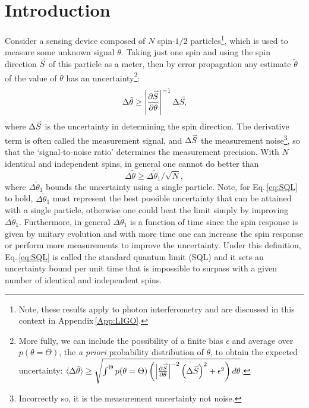 \documentclass[reqno]{amsart}
\def\be{\begin{equation}}
\def\ee{\end{equation}}
\def\est#1{\tilde{#1}}
\newcommand{\myvec}[1]{\accentset{\rightharpoonup}{#1}}
\begin{document}
\section*{Introduction}
Consider a sensing device composed of $N$ spin-$1/2$ particles\footnote{Note, these results apply to photon interferometry and are discussed in this context in Appendix\,\ref{App:LIGO}.}, which is used to measure some unknown signal $\theta$. %
Taking just one spin and using the spin direction $\myvec{S}$ of this particle as a meter, then by error propagation any estimate $\est{\theta}$ of the value of $\theta$ has an uncertainty\footnote{More fully, we can include the possibility of a finite bias $\epsilon$ and average over $p(\theta = \Theta)$, the \emph{a priori} probability distribution of $\theta$, to obtain the expected uncertainty: $\langle \Delta \est{\theta}\rangle \geq \sqrt{\int^{\Theta} p(\theta = \Theta)\left( \left| \frac{\partial \myvec{S}}{\partial \theta} \right|^{-2} \left(\Delta \myvec{S}\right)^2+\epsilon^2\right) d\theta}$.}:
\be
\Delta \est{\theta} \geq \left| \frac{\partial \myvec{S}}{\partial \theta} \right|^{-1} \Delta \myvec{S}, %
\label{eq:SNR}
\ee
where $\Delta \myvec{S}$ is the uncertainty in determining the spin direction. The derivative term is often called the measurement signal, and $\Delta \myvec{S}$ %
the measurement noise\footnote{Incorrectly so, it is the measurement uncertainty not noise.}, so that the `signal-to-noise ratio' determines the measurement precision. With $N$ identical and independent spins, in general one cannot do better than
\be
\Delta \est{\theta} \geq \Delta \est{\theta}_1 / \sqrt{N}, \label{eq:SQL}
\ee
where $\Delta \est{\theta}_1$ bounds the uncertainty using a single particle. Note, for Eq.\,\eqref{eq:SQL} to hold, $\Delta \est{\theta}_1$ must represent the best possible uncertainty that can be attained with a single particle, otherwise one could beat the limit simply by improving $\Delta \est{\theta}_1$. Furthermore, in general $\Delta \est{\theta}_1$ is a function of time since the spin response is given by unitary evolution and with more time one can increase the spin response or perform more measurements to improve the uncertainty. Under this definition, Eq.\,\eqref{eq:SQL} is called the standard quantum limit (SQL) and it sets an uncertainty bound per unit time that is impossible to surpass with a given number of identical and independent spins.
\end{document}
